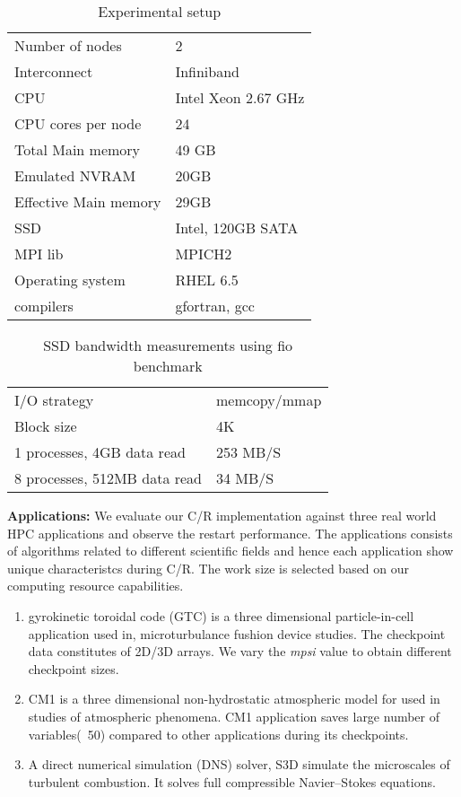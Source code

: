  
\begin{table}[h!]
\centering
\begin{tabular}{l l} 
\hline
 Number of nodes & 2\\
 Interconnect & Infiniband\\
 CPU & Intel Xeon 2.67 GHz \\  
 CPU cores per node  & 24 \\  
 Total Main memory & 49 GB\\
 Emulated NVRAM & 20GB\\
 Effective Main memory & 29GB\\
 SSD & Intel, 120GB SATA\\
 MPI lib & MPICH2\\
 Operating system & RHEL 6.5 \\  
 compilers & gfortran, gcc\\
 \hline
\end{tabular}
\caption{Experimental setup}
\label{fig:evaluation1}
\end{table}



\begin{table}[h!]
\centering
\begin{tabular}{l l} 
\hline
 I/O strategy & memcopy/mmap\\
 Block size & 4K\\
 1 processes, 4GB data read & 253 MB/S\\
 8 processes, 512MB data read & 34 MB/S\\ 
 \hline
\end{tabular}
\caption{SSD bandwidth measurements using fio benchmark}
\label{fig:evaluation1}
\end{table}



\textbf{Applications:} We evaluate our C/R implementation against three real world HPC applications and observe the restart performance. The applications consists of algorithms related to different scientific fields and hence each application show unique characteristcs during C/R.  The work size is selected 
based on our computing resource capabilities.
\begin{enumerate}
\item gyrokinetic toroidal code (GTC) is a three dimensional particle-in-cell application used in, microturbulance fushion device studies. The checkpoint data constitutes of 2D/3D arrays. We vary the \textit{mpsi} value to obtain different checkpoint sizes. 
\item CM1 is a three dimensional non-hydrostatic atmospheric model for used in studies of atmospheric phenomena. CM1 application saves large number of variables(~50) compared to other applications during its checkpoints.
\item A direct numerical simulation (DNS) solver, S3D \cite{chen2009terascale} simulate the microscales of turbulent combustion. It solves full compressible Navier–Stokes equations.


\end{enumerate}
